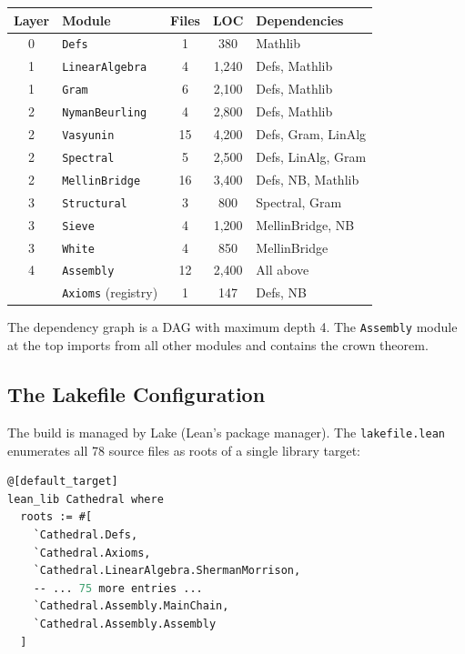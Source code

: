 \documentclass[11pt,a4paper]{article}
\theoremstyle{definition}
\newcommand{\lean}[1]{\texttt{#1}}
\begin{document}
\begin{center}
\small
\begin{tabular}{@{}clccl@{}}
\toprule
\textbf{Layer} & \textbf{Module} & \textbf{Files} & \textbf{LOC} & \textbf{Dependencies} \\
\midrule
0 & \lean{Defs} & 1 & 380 & Mathlib \\
1 & \lean{LinearAlgebra} & 4 & 1,240 & Defs, Mathlib \\
1 & \lean{Gram} & 6 & 2,100 & Defs, Mathlib \\
2 & \lean{NymanBeurling} & 4 & 2,800 & Defs, Mathlib \\
2 & \lean{Vasyunin} & 15 & 4,200 & Defs, Gram, LinAlg \\
2 & \lean{Spectral} & 5 & 2,500 & Defs, LinAlg, Gram \\
2 & \lean{MellinBridge} & 16 & 3,400 & Defs, NB, Mathlib \\
3 & \lean{Structural} & 3 & 800 & Spectral, Gram \\
3 & \lean{Sieve} & 4 & 1,200 & MellinBridge, NB \\
3 & \lean{White} & 4 & 850 & MellinBridge \\
4 & \lean{Assembly} & 12 & 2,400 & All above \\
\midrule
& \lean{Axioms} (registry) & 1 & 147 & Defs, NB \\
\bottomrule
\end{tabular}
\end{center}

The dependency graph is a DAG with maximum depth 4. The
\lean{Assembly} module at the top imports from all other modules
and contains the crown theorem.

\subsection{The Lakefile Configuration}

The build is managed by Lake (Lean's package manager). The
\lean{lakefile.lean} enumerates all 78 source files as roots
of a single library target:

\begin{lstlisting}[language=ML,caption={Lakefile structure (abbreviated)}]
@[default_target]
lean_lib Cathedral where
  roots := #[
    `Cathedral.Defs,
    `Cathedral.Axioms,
    `Cathedral.LinearAlgebra.ShermanMorrison,
    -- ... 75 more entries ...
    `Cathedral.Assembly.MainChain,
    `Cathedral.Assembly.Assembly
  ]
\end{lstlisting}
\end{document}
